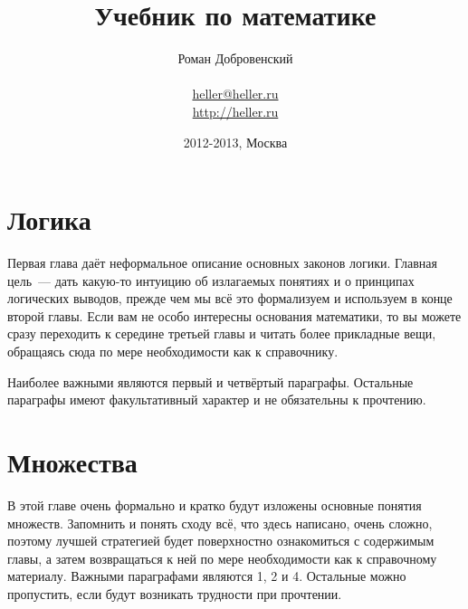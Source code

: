 \documentclass[a5paper,10pt,pagesize,DIV=classic]{scrbook}
\begin{document}
\title{Учебник по математике}
\author{Роман Добровенский\\ \\ \url{heller@heller.ru}\\ \url{http://heller.ru}}
\date{2012-2013, Москва}
\maketitle

\tableofcontents



\chapter{Логика}
Первая глава даёт неформальное описание основных законов логики. Главная цель~--- дать какую-то интуицию об излагаемых понятиях и о принципах логических выводов, прежде чем мы всё это формализуем и используем в конце второй главы. Если вам не особо интересны основания математики, то вы можете сразу переходить к середине третьей главы и читать более прикладные вещи, обращаясь сюда по мере необходимости как к справочнику.

Наиболее важными являются первый и четвёртый параграфы. Остальные параграфы имеют факультативный характер и не обязательны к прочтению.











\chapter{Множества}
В этой главе очень формально и кратко будут изложены основные понятия множеств. Запомнить и понять сходу всё, что здесь написано, очень сложно, поэтому лучшей стратегией будет поверхностно ознакомиться с содержимым главы, а затем возвращаться к ней по мере необходимости как к справочному материалу. Важными параграфами являются 1, 2 и 4. Остальные можно пропустить, если будут возникать трудности при прочтении.








\end{document}
